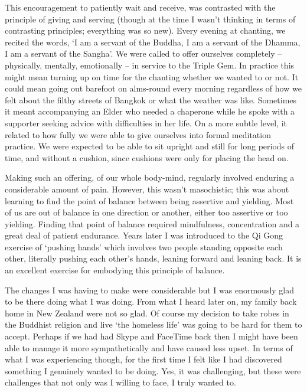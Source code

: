 This encouragement to patiently wait and receive, was contrasted with
the principle of giving and serving (though at the time I wasn't
thinking in terms of contrasting principles; everything was so new).
Every evening at chanting, we recited the words, `I am a servant of the
Buddha, I am a servant of the Dhamma, I am a servant of the Sangha'. We
were called to offer ourselves completely -- physically, mentally,
emotionally -- in service to the Triple Gem. In practice this might mean
turning up on time for the chanting whether we wanted to or not. It
could mean going out barefoot on alms-round every morning regardless of
how we felt about the filthy streets of Bangkok or what the weather was
like. Sometimes it meant accompanying an Elder who needed a chaperone
while he spoke with a supporter seeking advice with difficulties in her life. On a more subtle level, it related to how fully we were
able to give ourselves into formal meditation practice. We were expected
to be able to sit upright and still for long periods of time, and
without a cushion, since cushions were only for placing the head on.

Making such an offering, of our whole body-mind, regularly involved
enduring a considerable amount of pain. However, this wasn't
masochistic; this was about learning to find the point of balance
between being assertive and yielding. Most of us are out of balance in
one direction or another, either too assertive or too yielding. Finding
that point of balance required mindfulness, concentration and a great
deal of patient endurance. Years later I was introduced to the Qi Gong
exercise of `pushing hands' which involves two people standing opposite
each other, literally pushing each other's hands, leaning forward and
leaning back. It is an excellent exercise for embodying this principle
of balance.

The changes I was having to make were considerable but I was enormously
glad to be there doing what I was doing. From what I heard later on, my
family back home in New Zealand were not so glad. Of course my decision
to take robes in the Buddhist religion and live `the homeless life' was
going to be hard for them to accept. Perhaps if we had had Skype and
FaceTime back then I might have been able to manage it more
sympathetically and have caused less upset. In terms of what I was
experiencing though, for the first time I felt like I had discovered
something I genuinely wanted to be doing. Yes, it was challenging, but
these were challenges that not only was I willing to face, I truly
wanted to.

